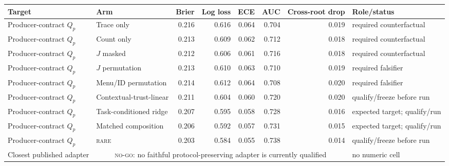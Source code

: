 \documentclass[10pt,a4paper,landscape]{article}
\newcommand{\rare}{\textsc{rare}}\newcommand{\na}{\textsc{n/a}}\newcommand{\nog}{\textsc{no-go}}\newcommand{\ok}{\textsc{pass}}
\begin{document}
\begin{center}\scriptsize\begin{tabular}{llrrrrrl}\toprule Target & Arm & Brier & Log loss & ECE & AUC & Cross-root drop & Role/status \\\midrule
Producer-contract $Q_p$ & Trace only & 0.216 & 0.616 & 0.064 & 0.704 & 0.019 & required counterfactual \\

Producer-contract $Q_p$ & Count only & 0.213 & 0.609 & 0.062 & 0.712 & 0.018 & required counterfactual \\

Producer-contract $Q_p$ & $J$ masked & 0.212 & 0.606 & 0.061 & 0.716 & 0.018 & required counterfactual \\

Producer-contract $Q_p$ & $J$ permutation & 0.213 & 0.610 & 0.063 & 0.710 & 0.019 & required falsifier \\

Producer-contract $Q_p$ & Menu/ID permutation & 0.214 & 0.612 & 0.064 & 0.708 & 0.020 & required falsifier \\

Producer-contract $Q_p$ & Contextual-trust-linear & 0.211 & 0.604 & 0.060 & 0.720 & 0.020 & qualify/freeze before run \\

Producer-contract $Q_p$ & Task-conditioned ridge & 0.207 & 0.595 & 0.058 & 0.728 & 0.016 & expected target; qualify/run \\

Producer-contract $Q_p$ & Matched composition & 0.206 & 0.592 & 0.057 & 0.731 & 0.015 & expected target; qualify/run \\

Producer-contract $Q_p$ & \rare{} & 0.203 & 0.584 & 0.055 & 0.738 & 0.014 & qualify/freeze before run \\

Closest published adapter & \multicolumn{6}{c}{\nog{}: no faithful protocol-preserving adapter is currently qualified} & no numeric cell \\
\bottomrule\end{tabular}\end{center}
\end{document}
